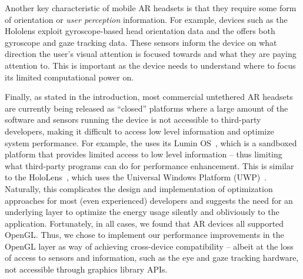 Another key characteristic of mobile AR headsets is that they require 
some form of orientation or \emph{user perception} information. For example, devices such as the Hololens exploit gyroscope-based head orientation data and the {\mlo} offers both gyroscope and gaze tracking data. These sensors inform the device on what direction the user's visual attention is focused towards and what they are paying attention to. This is important as the device needs to understand where to focus its limited computational power on.

Finally, as stated in the introduction, most commercial untethered AR headsets are currently being released as ``closed'' platforms where a large amount of the software and sensors running the device is not accessible to third-party developers, making it difficult to access low level information and optimize system performance.
%
For example, the {\mlo} uses its Lumin OS~\cite{magicleapone}, which is a sandboxed platform that provides limited access to low level information -- thus limiting what third-party programs can do for performance enhancement. This is similar to the  HoloLens~\cite{hololens}, which uses the Universal Windows Platform (UWP)~\cite{uwp}. 
%
Naturally, this complicates the design and implementation of optimization
approaches for most (even experienced) developers and suggests 
the need for an underlying layer to optimize the energy usage
silently and obliviously to the application. Fortunately, in all cases, we found that AR devices all supported OpenGL. Thus, we chose to implement our performance improvements in the OpenGL layer as way of achieving cross-device compatibility -- albeit at the loss of access to sensors and information, such as the eye and gaze tracking hardware, not accessible through graphics library APIs.







